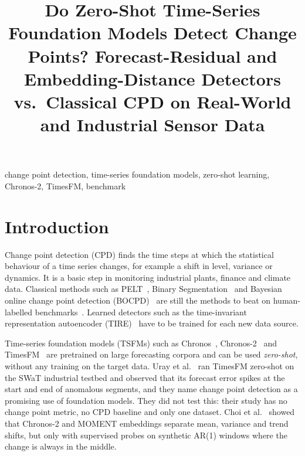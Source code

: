 \documentclass[conference]{IEEEtran}
\begin{document}
\title{Do Zero-Shot Time-Series Foundation Models Detect Change Points? Forecast-Residual and Embedding-Distance Detectors vs.\ Classical CPD on Real-World and Industrial Sensor Data}

\author{
}

\maketitle

\begin{abstract}

\end{abstract}

\begin{IEEEkeywords}
change point detection, time-series foundation models, zero-shot learning, Chronos-2, TimesFM, benchmark
\end{IEEEkeywords}

\section{Introduction}
Change point detection (CPD) finds the time steps at which the statistical behaviour of a time series changes, for example a shift in level, variance or dynamics. It is a basic step in monitoring industrial plants, finance and climate data. Classical methods such as PELT~\cite{killick2012pelt}, Binary Segmentation~\cite{scott1974binseg} and Bayesian online change point detection (BOCPD)~\cite{adams2007bocpd} are still the methods to beat on human-labelled benchmarks~\cite{vandenburg2020evaluation}. Learned detectors such as the time-invariant representation autoencoder (TIRE)~\cite{deryck2021tire} have to be trained for each new data source.

Time-series foundation models (TSFMs) such as Chronos~\cite{ansari2024chronos}, Chronos-2~\cite{ansari2025chronos2} and TimesFM~\cite{das2024timesfm} are pretrained on large forecasting corpora and can be used \emph{zero-shot}, without any training on the target data. Uray et al.~\cite{uray2026exploring} ran TimesFM zero-shot on the SWaT industrial testbed and observed that its forecast error spikes at the start and end of anomalous segments, and they name change point detection as a promising use of foundation models. They did not test this: their study has no change point metric, no CPD baseline and only one dataset. Choi et al.~\cite{choi2026nonstationarity} showed that Chronos-2 and MOMENT embeddings separate mean, variance and trend shifts, but only with supervised probes on synthetic AR(1) windows where the change is always in the middle.
\end{document}
